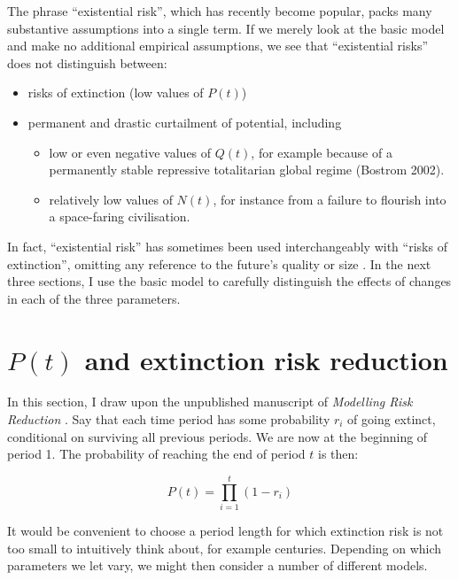 \documentclass[british]{article}
\begin{document}
The phrase ``existential risk'', which has recently become popular, packs many substantive assumptions into a single term. If we merely look at the basic model and make no additional empirical assumptions, we see that ``existential risks'' does not distinguish between:
\begin{itemize}
\item
  risks of extinction (low values of \(P(t)\))
\item
  permanent and drastic curtailment of potential, including
  \begin{itemize}
  \item
    low or even negative values of \(Q(t)\), for example because of a
    permanently stable repressive totalitarian global regime (Bostrom
    2002).
  \item
    relatively low values of \(N(t)\), for instance from a failure to flourish into a space-faring civilisation.
  \end{itemize}
\end{itemize}

In fact, ``existential risk'' has sometimes been used interchangeably with ``risks of extinction'', omitting any reference to the future's quality or size \citep{althaus_reducing_2016}. In the next three sections, I use the basic model to carefully distinguish the effects of changes in each of the three parameters.

\section{$P(t)$ and extinction risk reduction}\label{pt}

In this section, I draw upon the unpublished manuscript of \emph{Modelling Risk Reduction} \citep{ord_modelling_2014}. Say that each time period has some probability \(r_i\) of going extinct, conditional on surviving all previous periods. We are now at the beginning of period 1. The probability of reaching the end of period \(t\) is then:

\begin{equation}
  P(t) = \prod_{i=1}^{t}(1-r_i) \label{eq:pt}
\end{equation}


It would be convenient to choose a period length for which extinction risk is not too
small to intuitively think about, for example centuries. Depending on which parameters we let vary, we might then consider a number of
different models.
\end{document}
